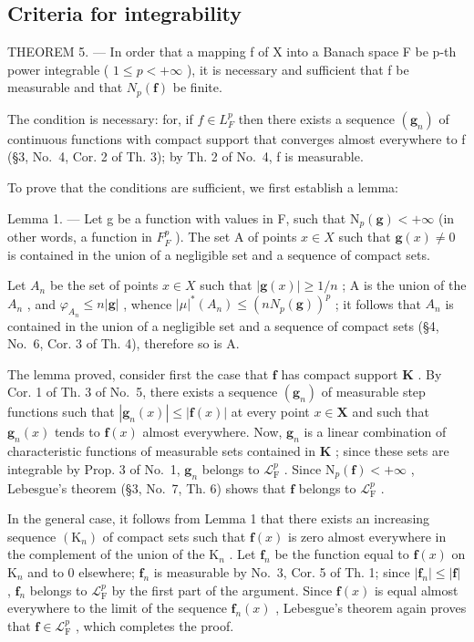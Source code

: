 \subsection{Criteria for integrability}

THEOREM 5. --- In order that a mapping f of X into a Banach space F be p-th power integrable ( \(1 \leqslant p < +\infty\) ), it is necessary and sufficient that f be measurable and that \(N_{p}(\mathbf{f})\) be finite.

The condition is necessary: for, if \(f \in L_{F}^{p}\) then there exists a sequence \((\mathbf{g}_{n})\) of continuous functions with compact support that converges almost everywhere to f (§3, No.~4, Cor. 2 of Th. 3); by Th. 2 of No.~4, f is measurable.

To prove that the conditions are sufficient, we first establish a lemma:

Lemma 1. --- Let g be a function with values in F, such that \(\mathrm{N}_{p}(\mathbf{g}) < +\infty\) (in other words, a function in \(F_{F}^{p}\) ). The set A of points \(x \in X\) such that \(\mathbf{g}(x) \neq 0\) is contained in the union of a negligible set and a sequence of compact sets.

Let \(A_{n}\) be the set of points \(x \in X\) such that \(|\mathbf{g}(x)| \geqslant 1/n\) ; A is the union of the \(A_{n}\) , and \(\varphi_{A_{n}} \leqslant n|\mathbf{g}|\) , whence \(|\mu|^{*}(A_{n}) \leqslant (nN_{p}(\mathbf{g}))^{p}\) ; it follows that \(A_{n}\) is contained in the union of a negligible set and a sequence of compact sets (§4, No.~6, Cor. 3 of Th. 4), therefore so is A.

The lemma proved, consider first the case that \(\mathbf{f}\) has compact support \(\mathbf{K}\) . By Cor. 1 of Th. 3 of No.~5, there exists a sequence \((\mathbf{g}_n)\) of measurable step functions such that \(|\mathbf{g}_n(x)| \leqslant |\mathbf{f}(x)|\) at every point \(x \in \mathbf{X}\) and such that \(\mathbf{g}_n(x)\) tends to \(\mathbf{f}(x)\) almost everywhere. Now, \(\mathbf{g}_n\) is a linear combination of characteristic functions of measurable sets contained in \(\mathbf{K}\) ; since these sets are integrable by Prop. 3 of No.~1, \(\mathbf{g}_n\) belongs to \(\mathcal{L}_{\mathrm{F}}^p\) . Since \(\mathrm{N}_p(\mathbf{f}) < +\infty\) , Lebesgue's theorem (§3, No.~7, Th. 6) shows that \(\mathbf{f}\) belongs to \(\mathcal{L}_{\mathrm{F}}^p\) .

In the general case, it follows from Lemma 1 that there exists an increasing sequence \((\mathrm{K}_n)\) of compact sets such that \(\mathbf{f}(x)\) is zero almost everywhere in the complement of the union of the \(\mathrm{K}_n\) . Let \(\mathbf{f}_n\) be the function equal to \(\mathbf{f}(x)\) on \(\mathrm{K}_n\) and to 0 elsewhere; \(\mathbf{f}_n\) is measurable by No.~3, Cor. 5 of Th. 1; since \(|\mathbf{f}_n| \leqslant |\mathbf{f}|\) , \(\mathbf{f}_n\) belongs to \(\mathcal{L}_{\mathrm{F}}^p\) by the first part of the argument. Since \(\mathbf{f}(x)\) is equal almost everywhere to the limit of the sequence \(\mathbf{f}_n(x)\) , Lebesgue's theorem again proves that \(\mathbf{f} \in \mathcal{L}_{\mathrm{F}}^p\) , which completes the proof.


